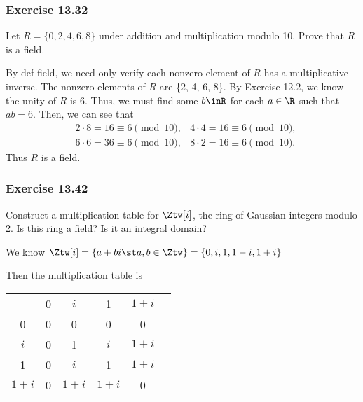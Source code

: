 \documentclass{article}
\begin{document}
\subsubsection*{Exercise 13.32}
Let \( R = \{0, 2, 4, 6, 8\} \) under addition and multiplication modulo 10. Prove that \( R \) is a field.

\begin{solution} %
  By def field, we need only verify each nonzero element of \( R \) has a multiplicative inverse. The nonzero elements of \( R \) are \{2, 4, 6, 8\}. By Exercise 12.2, we know the unity of \( R \) is 6. Thus, we must find some \( b\inR \) for each \( a\in\R \) such that \( ab = 6 \). Then, we can see that
  \begin{align*}
    &2\cdot 8 = 16 \equiv 6 \pmod{10}, &4\cdot 4 = 16 \equiv 6 \pmod{10}, \\
    &6\cdot 6 = 36 \equiv 6 \pmod{10}, &8\cdot 2 = 16 \equiv 6 \pmod{10}.
  \end{align*}
  Thus \( R \) is a field.
\end{solution}

\subsubsection*{Exercise 13.42}
Construct a multiplication table for \( \Ztw[i] \), the ring of Gaussian integers modulo 2. Is this ring a field? Is it an integral domain?

\begin{solution} %
  We know \( \Ztw[i] = \{a+bi\st a,b\in\Ztw\} = \{0, i, 1, 1-i, 1+i\} \)

  Then the multiplication table is
  \begin{center}
    \begin{tabular}{c | c c c c c}
                  & 0       & \( i \)   & 1         & \( 1+i \) \\ \cline{1-5}
        0         & 0       & 0         & 0         & 0  \\
        \( i \)   & 0       & 1         & \( i \)   & \( 1+i \)  \\
        1         & 0       & \( i \)   & 1         & \( 1+i \)  \\
        \( 1+i \) & 0       & \( 1+i \) & \( 1+i \) & 0  \\
    \end{tabular}\\
\end{center}
\end{solution}
\end{document}
